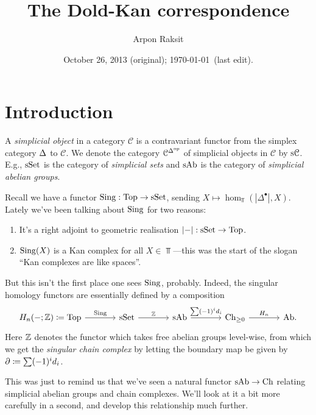 


\title{The Dold-Kan correspondence}
\author{Arpon Raksit}
\date{October 26, 2013 (original); \today\ (last edit).}


\maketitle
\thispagestyle{fancy}


\renewcommand{\C}{\mathcal{C}}

\section{Introduction}

\begin{definition}
  A \textit{simplicial object} in a category $\C$ is a contravariant
  functor from the simplex category $\Delta$ to $\C$. We denote the
  category $\C^{\Simplex^\op}$ of simplicial objects in $\C$ by
  $\s\C$. E.g., $\mathrm{s}\mathrm{Set}$ is the category of \textit{simplicial sets}
  and $\mathrm{s}\mathrm{Ab}$ is the category of \textit{simplicial abelian groups}.
\end{definition}

Recall we have a functor $\operatorname{Sing} : \mathrm{Top} \to \mathrm{s}\mathrm{Set}$, sending $X \mapsto
\hom_\Top(|\Delta^\bullet|, X)$. Lately we've been talking about
$\operatorname{Sing}$ for two reasons:
\begin{enumerate}
\item It's a right adjoint to geometric realisation $|{-}| : \mathrm{s}\mathrm{Set}
  \to \mathrm{Top}$.
\item $\operatorname{Sing}(X)$ is a Kan complex for all $X \in \Top$---this was the
  start of the slogan ``Kan complexes are like spaces''.
\end{enumerate}
But this isn't the first place one sees $\operatorname{Sing}$, probably. Indeed, the
singular homology functors are essentially defined by a composition
\[
\begin{tikzcd}[column sep = large]
  \H_n(-;\Z) \coloneqq \Top \rar{\Sing} & \s\Set \rar{\Z} & \s\Ab
  \rar{\sum (-1)^i d_i} & \Ch_{\ge 0} \rar{\H_n} & \Ab.
\end{tikzcd}
\]
Here $\mathbb{Z}$ denotes the functor which takes free abelian groups
level-wise, from which we get the \textit{singular chain complex} by
letting the boundary map be given by $\partial \coloneqq \sum (-1)^i d_i$.

\medskip
This was just to remind us that we've seen a natural functor $\mathrm{s}\mathrm{Ab}
\to \mathrm{Ch}$ relating simplicial abelian groups and chain complexes. We'll
look at it a bit more carefully in a second, and develop this
relationship much further.


